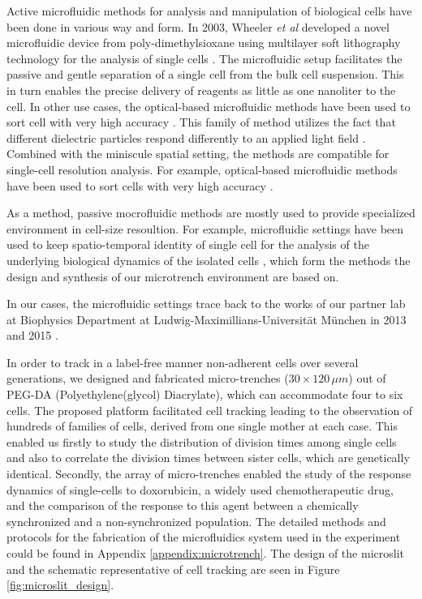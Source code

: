 \documentclass[pdftex,12pt,a4paper]{report}
\begin{document}
Active microfluidic methods for analysis and manipulation of biological cells have been done in various way and form. In 2003, Wheeler \textit{et al} developed a novel microfluidic device from poly-dimethylsioxane using multilayer soft lithography technology for the analysis of single cells \cite{wheeler2003microfluidic}. The microfluidic setup facilitates the passive and gentle separation of a single cell from the bulk cell suspension. This in turn enables the precise delivery of reagents as little as one nanoliter to the cell. In other use cases, the optical-based microfluidic methods have been used to sort cell with very high accuracy \cite{macdonald2003microfluidic}. This family of method utilizes the fact that different dielectric particles respond differently to an applied light field \cite{tatarkova2003brownian}. Combined with the miniscule spatial setting, the methods are compatible for single-cell resolution analysis. For example, optical-based microfluidic methods have been used to sort cells with very high accuracy \cite{macdonald2003microfluidic, wang2005microfluidic, baret2009fluorescence}.

As a method, passive mocrofluidic methods are mostly used to provide specialized environment in cell-size resoultion. For example, microfluidic settings have been used to keep spatio-temporal identity of single cell for the analysis of the underlying biological dynamics of the isolated cells \cite{mu2013microfluidics, sekhavati2015marker}, which form the methods the design and synthesis of our microtrench environment are based on.

In our cases, the microfluidic settings trace back to the works of our partner lab at Biophysics Department at Ludwig-Maximillians-Universit\"at M\"unchen in 2013 \cite{marel2013arraying} and 2015 \cite{sekhavati2015marker, sekhavati2015dynamic}.

In order to track in a label-free manner non-adherent cells over several generations, we designed and fabricated micro-trenches ($30 \times 120 \, \mu m$) out of PEG-DA (Polyethylene(glycol) Diacrylate), which can accommodate four to six cells. The proposed platform facilitated cell tracking leading to the observation of hundreds of families of cells, derived from one single mother at each case. This enabled us firstly to study the distribution of division times among single cells and also to correlate the division times between sister cells, which are genetically identical. Secondly, the array of micro-trenches enabled the study of the response dynamics of single-cells to doxorubicin, a widely used chemotherapeutic drug, and the comparison of the response to this agent between a chemically synchronized and a non-synchronized population. The detailed methods and protocols for the fabrication of the microfluidics system used in the experiment could be found in Appendix \ref{appendix:microtrench}. The design of the microslit and the schematic representative of cell tracking are seen in Figure \ref{fig:microslit_design}.
\end{document}
